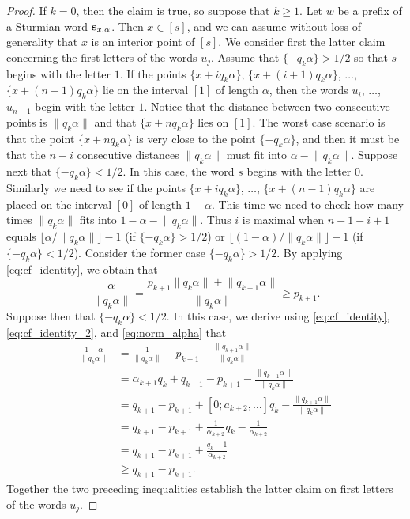 \documentclass[a4paper,fleqn]{article}
\providecommand{\norm}[1]{\lVert#1\rVert}
\providecommand{\floor}[1]{\lfloor#1\rfloor}
\newcommand{\infw}[1]{%
  \ifcat\noexpand#1\relax\bm{#1}%
  \else\mathbf{#1}\fi}          %
\begin{document}
  \begin{proof}
    If $k = 0$, then the claim is true, so suppose that $k \geq 1$. Let $w$ be a prefix of a Sturmian word
    $\infw{s}_{x,\alpha}$. Then $x \in [s]$, and we can assume without loss of generality that $x$ is an interior point
    of $[s]$. We consider first the latter claim concerning the first letters of the words $u_j$. Assume that
    $\{-q_k\alpha\} > 1/2$ so that $s$ begins with the letter $1$. If the points $\{x + iq_k\alpha\}$,
    $\{x + (i+1)q_k\alpha\}$, $\ldots$, $\{x + (n - 1)q_k\alpha\}$ lie on the interval $[1]$ of length $\alpha$, then
    the words $u_i$, $\ldots$, $u_{n-1}$ begin with the letter $1$. Notice that the distance between two consecutive
    points is $\norm{q_k\alpha}$ and that $\{x + nq_k\alpha\}$ lies on $[1]$. The worst case scenario is that the point
    $\{x + nq_k\alpha\}$ is very close to the point $\{-q_k\alpha\}$, and then it must be that the $n - i$ consecutive
    distances $\norm{q_k\alpha}$ must fit into $\alpha -  \norm{q_k\alpha}$. Suppose next that $\{-q_k\alpha\} < 1/2$.
    In this case, the word $s$ begins with the letter $0$. Similarly we need to see if the points $\{x + iq_k\alpha\}$,
    $\ldots$, $\{x + (n - 1)q_k\alpha\}$ are placed on the interval $[0]$ of length $1 - \alpha$. This time we need to
    check how many times $\norm{q_k\alpha}$ fits into $1 - \alpha - \norm{q_k\alpha}$. Thus $i$ is maximal when
    $n - 1 - i + 1$ equals $\floor{\alpha/\norm{q_k\alpha}} - 1$ (if $\{-q_k\alpha\} > 1/2$) or
    $\floor{(1-\alpha)/\norm{q_k\alpha}} - 1$ (if $\{-q_k\alpha\} < 1/2$). Consider the former case
    $\{-q_k\alpha\} > 1/2$. By applying \eqref{eq:cf_identity}, we obtain that
    \begin{equation*}
      \frac{\alpha}{\norm{q_k\alpha}} = \frac{p_{k+1}\norm{q_k\alpha} + \norm{q_{k+1}\alpha}}{\norm{q_k\alpha}} \geq p_{k+1}.
    \end{equation*}
    Suppose then that $\{-q_k\alpha\} < 1/2$. In this case, we derive using \eqref{eq:cf_identity},
    \eqref{eq:cf_identity_2}, and \eqref{eq:norm_alpha} that
    \begin{align*}
      \frac{1 - \alpha}{\norm{q_k\alpha}} &= \frac{1}{\norm{q_k\alpha}} - p_{k+1} - \frac{\norm{q_{k+1}\alpha}}{\norm{q_k\alpha}} \\
                                          &= \alpha_{k+1}q_k + q_{k-1} - p_{k+1} - \frac{\norm{q_{k+1}\alpha}}{\norm{q_k\alpha}} \\
                                          &= q_{k+1} - p_{k+1} + [0; a_{k+2}, \ldots]q_k - \frac{\norm{q_{k+1}\alpha}}{\norm{q_k\alpha}} \\
                                          &= q_{k+1} - p_{k+1} + \frac{1}{\alpha_{k+2}}q_k - \frac{1}{\alpha_{k+2}} \\
                                          &= q_{k+1} - p_{k+1} + \frac{q_k - 1}{\alpha_{k+2}} \\
                                          &\geq q_{k+1} - p_{k+1}.
    \end{align*}
    Together the two preceding inequalities establish the latter claim on first letters of the words $u_j$.


\end{proof}
\end{document}

